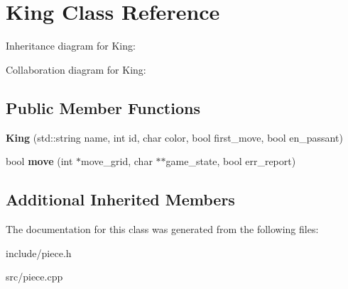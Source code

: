 \hypertarget{classKing}{}\section{King Class Reference}
\label{classKing}


Inheritance diagram for King\+:


Collaboration diagram for King\+:
\subsection*{Public Member Functions}
\begin{DoxyCompactItemize}
\item 
\mbox{\label{classKing_aa47a8ee71efdbc4944a4905a5f422ff9}} 
{\bfseries King} (std\+::string name, int id, char color, bool first\+\_\+move, bool en\+\_\+passant)
\item 
\mbox{\label{classKing_ab1c0db24d6856bd48f98bcfe6a04beb5}} 
bool {\bfseries move} (int $\ast$move\+\_\+grid, char $\ast$$\ast$game\+\_\+state, bool err\+\_\+report)
\end{DoxyCompactItemize}
\subsection*{Additional Inherited Members}


The documentation for this class was generated from the following files\+:\begin{DoxyCompactItemize}
\item 
include/piece.\+h\item 
src/piece.\+cpp\end{DoxyCompactItemize}

